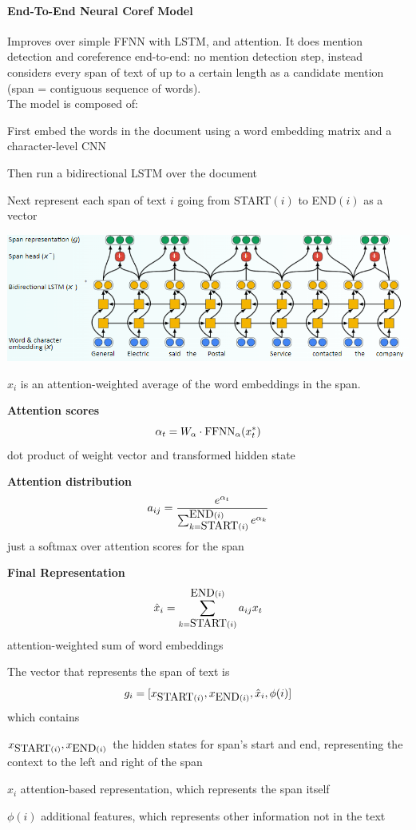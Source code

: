 \documentclass[10pt]{report}
\begin{document}
\paragraph{End-To-End Neural Coref Model}Improves over simple FFNN with LSTM, and attention. It does mention detection and coreference end-to-end: no mention detection step, instead considers every span of text of up to a certain length as a candidate mention (span = contiguous sequence of words).\\
The model is composed of:
\begin{list}{}{}
	\item First embed the words in the document using a word embedding matrix and a character-level CNN
	\item Then run a bidirectional LSTM over the document
	\item Next represent each span of text $i$ going from START$(i)$ to END$(i)$ as a vector
\end{list}
\begin{center}
	\includegraphics[scale=0.5]{113.png}
\end{center}
$\hat{x}_i$ is an attention-weighted average of the word embeddings in the span.
\begin{list}{}{}
	\item \textbf{Attention scores} $$\alpha_t = W_\alpha\cdot \hbox{FFNN}_\alpha(x^*_t)$$
	dot product of weight vector and transformed hidden state
	\item \textbf{Attention distribution} $$a_{ij} = \frac{e^{\alpha_t}}{\sum_{k=\hbox{START}(i)}^{\hbox{END}(i)}e^{\alpha_k}}$$
	just a softmax over attention scores for the span
	\item \textbf{Final Representation} $$\hat{x}_i = \sum_{k=\hbox{START}(i)}^{\hbox{END}(i)} a_{ij}x_t$$
	attention-weighted sum of word embeddings
\end{list}
The vector that represents the span of text is
$$g_i = [x_{\hbox{START}(i)},x_{\hbox{END}(i)},\hat{x}_i, \phi(i)]$$
which contains
\begin{list}{}{}
	\item $x_{\hbox{START}(i)},x_{\hbox{END}(i)}$ the hidden states for span's start and end, representing the context to the left and right of the span
	\item $\hat{x}_i$ attention-based representation, which represents the span itself
	\item $\phi(i)$ additional features, which represents other information not in the text
\end{list}
\end{document}
